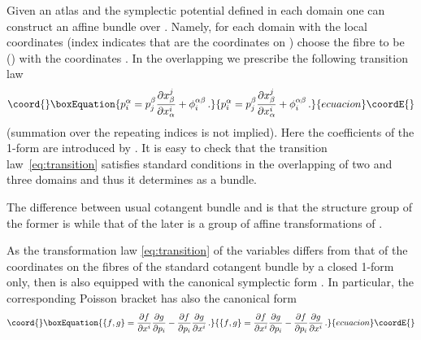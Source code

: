 \documentclass[a4paper,11pt,oneside]{amsart}
\theoremstyle{plain}
\numberwithin{equation}{section} %
\numberwithin{figure}{section} %
\providecommand{\pb}[2]{\left\{{}#1{},{}#2{}\right\}}
\renewcommand{\dim}[1]{{\rm dim}(#1)}
\def\d{\partial}
\def\mod{{\mathcal T}^*_\rho}
\def\manM{{\mathcal M}}
\begin{document}
\noindent
Given an atlas \coordHE{} and the symplectic
potential \myHighlight{$\rho^\alpha$}\coordHE{} defined in each domain \coordHE{}
one can construct an affine bundle \myHighlight{$\mod\manM$}\coordHE{}
over \myHighlight{$\manM$}\coordHE{}. Namely, for each domain \coordHE{} with
the local coordinates \coordHE{} (index \myHighlight{$\alpha$}\coordHE{} indicates
that \coordHE{} are the coordinates on \coordHE{}) choose
the fibre to be \coordHE{} (\myHighlight{$N=\dim{\manM}$}\coordHE{}) with the coordinates
\coordHE{}.  In the overlapping \coordHE{} we
prescribe the following transition law
\begin{equation}\coord{}\boxEquation{
\label{eq:transition}
  p^\alpha_i=p^\beta_j \frac{\d x^j_\beta}{\d x^i_\alpha}
  +\phi^{\alpha \beta}_i\,.
}{
p^\alpha_i=p^\beta_j \frac{\d x^j_\beta}{\d x^i_\alpha}
  +\phi^{\alpha \beta}_i\,.
}{ecuacion}\coordE{}\end{equation}
(summation over the repeating indices \myHighlight{$\alpha,\beta,\ldots$}\coordHE{}
is not implied).  Here the coefficients \coordHE{} of
the 1-form \myHighlight{$\phi^{\alpha \beta}$}\coordHE{} are introduced by
\coordHE{}.
It is easy to check that the transition law~\eqref{eq:transition}
satisfies standard conditions in the overlapping of two and three
domains and thus it determines \myHighlight{$\mod\manM$}\coordHE{} as a bundle.

\noindent
The difference between usual cotangent bundle \myHighlight{$T^*\manM$}\coordHE{} and
\myHighlight{$\mod\manM$}\coordHE{} is that the structure group of the former is \coordHE{}
while that of the later is a group of affine transformations of \coordHE{}.


\noindent
As the transformation law \eqref{eq:transition} of the
variables \coordHE{} differs from that of the coordinates on
the fibres of the standard cotangent bundle by a closed
1-form only, then \myHighlight{$\mod\manM$}\coordHE{} is also equipped with the
canonical symplectic form \coordHE{}. In particular,
the corresponding Poisson bracket has also the canonical form
\begin{equation}\coord{}\boxEquation{
  \label{eq:FMPB}
  \pb{f}{g}=\frac{\d f}{\d x^i}\frac{\d g}{\d p_i}-
  \frac{\d f}{\d p_i}\frac{\d g}{\d x^i}\,.
}{
  \pb{f}{g}=\frac{\d f}{\d x^i}\frac{\d g}{\d p_i}-
  \frac{\d f}{\d p_i}\frac{\d g}{\d x^i}\,.
}{ecuacion}\coordE{}\end{equation}
\end{document}
